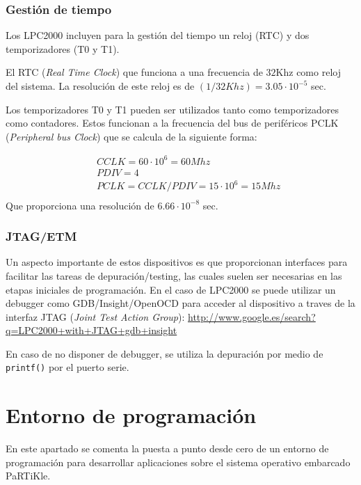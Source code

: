 \documentclass[10pt,a4paper]{article}
\newcommand{\hrefx}[1]{\href{#1}{#1}} %
\begin{document}
	\subsubsection{Gestión de tiempo}

	Los LPC2000 incluyen para la gestión del tiempo un reloj (RTC) y dos temporizadores (T0 y T1).

	El RTC (\emph{Real Time Clock}) que funciona a una frecuencia de $32$Khz como reloj del sistema. La resolución de este reloj es de $(1 / 32 Khz) = 3.05 \cdot 10^{-5}$ sec.

	Los temporizadores T0 y T1 pueden ser utilizados tanto como temporizadores como contadores. Estos funcionan a la frecuencia del bus de periféricos PCLK (\emph{Peripheral bus Clock}) que se calcula de la siguiente forma:

	\begin{eqnarray*}
	        & & CCLK = 60 \cdot 10^6 = 60 Mhz \\
	        & & PDIV	= 4 \\
	        & & PCLK = CCLK / PDIV = 15 \cdot 10^6 = 15 Mhz \\
	\end{eqnarray*}
	Que proporciona una resolución de $6.66 \cdot 10^{-8}$ sec.
	
	\subsubsection{JTAG/ETM}

	Un aspecto importante de estos dispositivos es que proporcionan interfaces para facilitar las tareas de depuración/testing, las cuales suelen ser necesarias en las etapas iniciales de programación. En el caso de LPC2000 se puede utilizar un debugger como GDB/Insight/OpenOCD para acceder al dispositivo a traves de la interfaz JTAG (\emph{Joint Test Action Group}): \hrefx{http://www.google.es/search?q=LPC2000+with+JTAG+gdb+insight}

	En caso de no disponer de debugger, se utiliza la depuración por medio de \texttt{printf()} por el puerto serie.

	\newpage
	
	\section{Entorno de programación}
	
	En este apartado se comenta la puesta a punto desde cero de un entorno de programación para desarrollar aplicaciones sobre el sistema operativo embarcado PaRTiKle.
	
\end{document}
